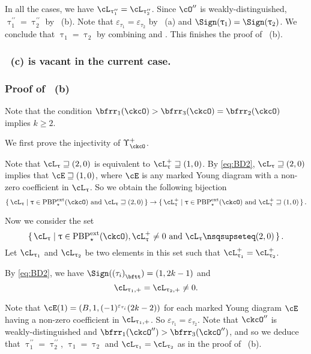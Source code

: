 \documentclass[12pt,a4paper]{amsart}
\numberwithin{equation}{section}
\theoremstyle{remark}
\def\PBPes{\mathrm{PBP}^{\mathrm{ext}}_{\star}}
\def\uptaupp{\uptau^{\prime\prime}}
\begin{document}
In all the cases, we have $\ac_{\uptaupp_1} = \ac_{\uptaupp_2}$.
Since $\cO''$ is weakly-distinguished,   $\uptaupp_{1}=\uptaupp_{2}$ by
~(b). Note that $\varepsilon_{\tau_1}=\varepsilon_{\tau_2}$ by
~(a) and $\Sign(\uptau_{1})=\Sign(\uptau_{2})$. We conclude that
$\uptau_{1}=\uptau_{2}$ by combining  and .
This finishes the proof of ~(b).

\subsubsection*{~(c) is vacant in the current case.}


\subsubsection*{Proof of ~(b)}

Note that the condition $\bfrr_{1}(\ckcO)>\bfrr_{3}(\ckcO)=\bfrr_{2}(\ckcO)$
implies $k\geq 2$.

\medskip

We first prove the injectivity of $\Upsilon^{+}_{\ckcO}$.

Note that
  $\ac_{\uptau}\sqsupseteq (2,0)$ is equivalent to $\pac{\uptau}\sqsupseteq
  (1,0)$. By \eqref{eq:BD2},  $\ac_{\uptau}\sqsupseteq (2,0)$ implies that %
  $\cE \sqsupseteq (1,0)$, where $\cE$ is any marked Young diagram  with a non-zero coefficient in $\ac_{\uptau}$. So we obtain the following  bijection
  \[
    \set{\ac_{\uptau}|\uptau\in \PBPes(\ckcO) \text{ and }\ac_{\uptau}\sqsupseteq (2,0)} \rightarrow
     \set{\pac{\uptau}|\uptau\in \PBPes(\ckcO) \text{ and }\pac{\uptau}\sqsupseteq (1,0)}.
  \]

  Now we consider the set
  \[
   \set{\ac_{\uptau}|\uptau\in \PBPes(\ckcO),
  \pac{\uptau}\neq 0 \text{ and } \ac_{\uptau}\nsqsupseteq (2,0)}.
  \]
   Let $\ac_{\uptau_{1}}$
  and $\ac_{\uptau_{2}}$ be two elements in this set such that
  $\pac{\uptau_{1}}=\pac{\uptau_{2}}$.

  By \eqref{eq:BD2}, we have $\Sign(\ttail{(\tau_{i})}) = (1,2k-1)$ and
  \begin{equation}\label{eq:ft1}
  \ppac{\uptau_1} = \ppac{\uptau_2}\neq 0.
  \end{equation}

    Note that $\cE(1) = (B,1, (-1)^{\varepsilon_{\tau_{i}}}(2k-2))$ for each  marked Young diagram $\cE$ having a non-zero
    coefficient in $\ppac{\uptau_1}$. So $\varepsilon_{\tau_{1}}=\varepsilon_{\tau_{2}}$.
    Note that $\ckcO''$ is weakly-distinguished and $\bfrr_{1}(\ckcO'')>\bfrr_{3}(\ckcO'')$, and so we deduce that
    $\uptaupp_1 = \uptaupp_2$, $\uptau_1 =\uptau_2$ and $\ac_{\uptau_1} = \ac_{\uptau_2}$ as in the proof of ~(b).
\end{document}
